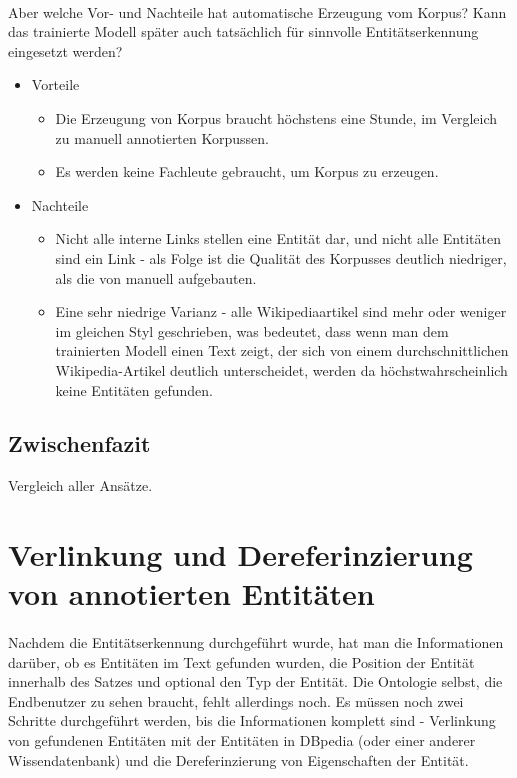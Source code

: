 \paragraph{}
Aber welche Vor- und Nachteile hat automatische Erzeugung vom Korpus? Kann das trainierte Modell später auch tatsächlich für sinnvolle Entitätserkennung eingesetzt werden?
\begin{itemize}
\item Vorteile
\begin{itemize}
\item Die Erzeugung von Korpus braucht höchstens eine Stunde, im Vergleich zu manuell annotierten Korpussen.
\item Es werden keine Fachleute gebraucht, um Korpus zu erzeugen.
\end{itemize}
\item Nachteile
\begin{itemize}
\item Nicht alle interne Links stellen eine Entität dar, und nicht alle Entitäten sind ein Link - als Folge ist die Qualität des Korpusses deutlich niedriger, als die von manuell aufgebauten.
\item Eine sehr niedrige Varianz - alle Wikipediaartikel sind mehr oder weniger im gleichen Styl geschrieben, was bedeutet, dass wenn man dem trainierten Modell einen Text zeigt, der sich von einem durchschnittlichen Wikipedia-Artikel deutlich unterscheidet, werden da höchstwahrscheinlich keine Entitäten gefunden.
\end{itemize}
\end{itemize}

\subsection{Zwischenfazit}
Vergleich aller Ansätze.

\section{Verlinkung und Dereferinzierung von annotierten Entitäten}
\paragraph{}
Nachdem die Entitätserkennung durchgeführt wurde, hat man die Informationen darüber, ob es Entitäten im Text gefunden wurden, die Position der Entität innerhalb des Satzes und optional den Typ der Entität. Die Ontologie selbst, die Endbenutzer zu sehen braucht, fehlt allerdings noch. Es müssen noch zwei Schritte durchgeführt werden, bis die Informationen komplett sind - Verlinkung von gefundenen Entitäten mit der Entitäten in DBpedia (oder einer anderer Wissendatenbank) und die Dereferinzierung von Eigenschaften der Entität.

